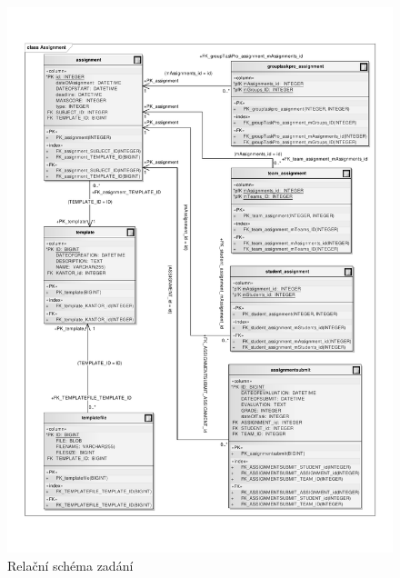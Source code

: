 \documentclass[11pt,twoside,a4paper]{book}
\begin{document}
\begin{figure}
\begin{center}
\includegraphics[width=\linewidth]{images/assignmentRelation}
\caption{Relační schéma zadání}
\label{img:assignmetnRelation}
\end{center}
\end{figure}
\end{document}
